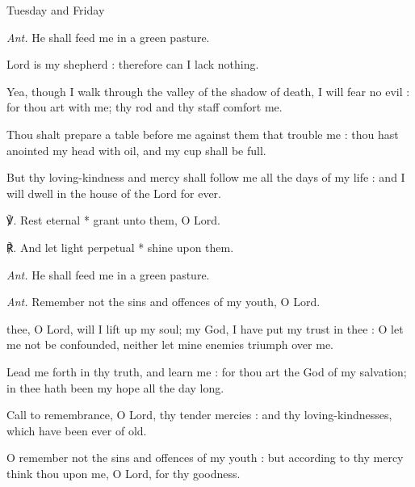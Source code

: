 \begin{inhead}
    {Tuesday and Friday}
\end{inhead}
\par\noindent
\textit{Ant.} He shall feed me {\dag} in a green pasture.\par
{} Lord is my shepherd : therefore can I lack nothing.\par
{}
Yea, though I walk through the valley of the shadow of death, I will fear no evil : for thou art with me; thy rod and thy staff comfort me.\par
{}Thou shalt prepare a table before me against them that trouble me : thou hast anointed my head with oil, and my cup shall be full.\par
{}But thy loving-kindness and mercy shall follow me all the days of my life : and I will dwell in the house of the Lord for ever.\par
℣. Rest eternal * grant unto them, O Lord.\par
℟. And let light perpetual * shine upon them.\par\noindent
\textit{Ant.} He shall feed me in a green pasture.\par
{}\par\noindent
\textit{Ant.} Remember not {\dag} the sins and offences of my youth, O Lord.\par
{} thee, O Lord, will I lift up my soul; my God, I have put my trust in thee : O let me not be confounded, neither let mine enemies triumph over me.\par
{}
Lead me forth in thy truth, and learn me : for thou art the God of my salvation; in thee hath been my hope all the day long.\par
{}Call to remembrance, O Lord, thy tender mercies : and thy loving-kindnesses, which have been ever of old.\par
{}O remember not the sins and offences of my youth : but according to thy mercy think thou upon me, O Lord, for thy goodness.\par
